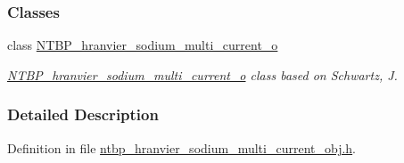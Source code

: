 \subsubsection*{Classes}
\begin{DoxyCompactItemize}
\item 
class \hyperlink{class_n_t_b_p__hranvier__sodium__multi__current__o}{NTBP\_\-hranvier\_\-sodium\_\-multi\_\-current\_\-o}
\begin{DoxyCompactList}\small\item\em \hyperlink{class_n_t_b_p__hranvier__sodium__multi__current__o}{NTBP\_\-hranvier\_\-sodium\_\-multi\_\-current\_\-o} class based on Schwartz, J. \item\end{DoxyCompactList}\end{DoxyCompactItemize}


\subsubsection{Detailed Description}


Definition in file \hyperlink{ntbp__hranvier__sodium__multi__current__obj_8h_source}{ntbp\_\-hranvier\_\-sodium\_\-multi\_\-current\_\-obj.h}.

